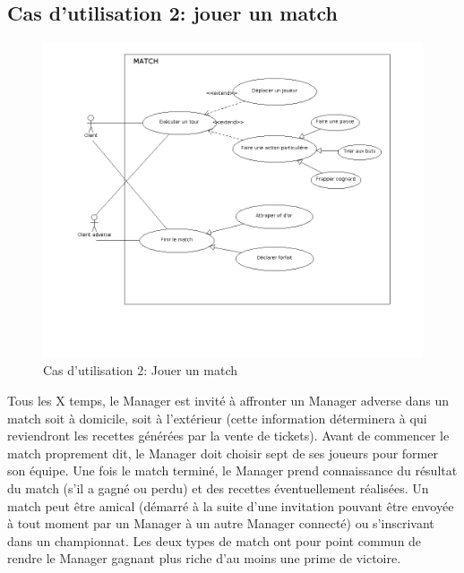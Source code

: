 \documentclass[a4paper,titlepage]{scrreprt}
\begin{document}
  \subsection{Cas d'utilisation 2: jouer un match}
    \begin{figure}[H]
    \center
    \includegraphics[scale=0.4]{uml/useCaseView/Match.png}
    \caption{Cas d'utilisation 2: Jouer un match}
  \end{figure}	
    Tous les X temps, le Manager est invité à affronter un Manager adverse dans un \gls{match} soit à
    domicile, soit à l'extérieur (cette information déterminera à qui reviendront les recettes
    générées par la vente de tickets). Avant de commencer le match proprement dit,
    le Manager doit choisir sept de ses joueurs pour former son équipe. 
    Une fois le match terminé, le Manager prend connaissance du résultat du match 
    (s'il a gagné ou perdu) et des recettes éventuellement réalisées. Un match peut être amical (démarré à la suite d'une invitation pouvant être envoyée à tout moment par un Manager à un autre Manager connecté) ou s'inscrivant dans un championnat. Les deux types de match ont pour point commun de rendre le Manager gagnant plus riche d'au moins une prime de victoire.
\end{document}
